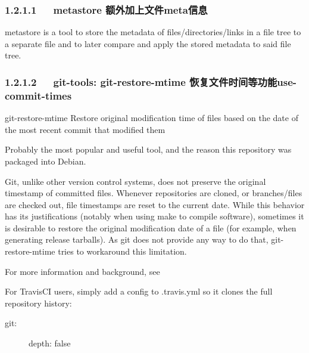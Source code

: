 \documentclass[letterpaper,12pt,english]{sphinxmanual}
\begin{document}
\subsubsection{1.2.1.1   metastore 额外加上文件meta信息}
\label{\detokenize{001software/001install/001._u7f51_u7ad9/github:metastore-meta}}

metastore is a tool to store the metadata of files/directories/links in a file tree to a separate file and to later compare and apply the stored metadata to said file tree.


\subsubsection{1.2.1.2   git-tools: git-restore-mtime 恢复文件时间等功能use-commit-times}
\label{\detokenize{001software/001install/001._u7f51_u7ad9/github:git-tools-git-restore-mtime-use-commit-times}}

git-restore-mtime
Restore original modification time of files based on the date of the most recent commit that modified them

Probably the most popular and useful tool, and the reason this repository was packaged into Debian.

Git, unlike other version control systems, does not preserve the original timestamp of committed files. Whenever repositories are cloned, or branches/files are checked out, file timestamps are reset to the current date. While this behavior has its justifications (notably when using make to compile software), sometimes it is desirable to restore the original modification date of a file (for example, when generating release tarballs). As git does not provide any way to do that, git-restore-mtime tries to workaround this limitation.

For more information and background, see 

For TravisCI users, simply add a config to .travis.yml so it clones the full repository history:
\begin{description}
\item[{git:}] \leavevmode
depth: false

\end{description}
\end{document}
